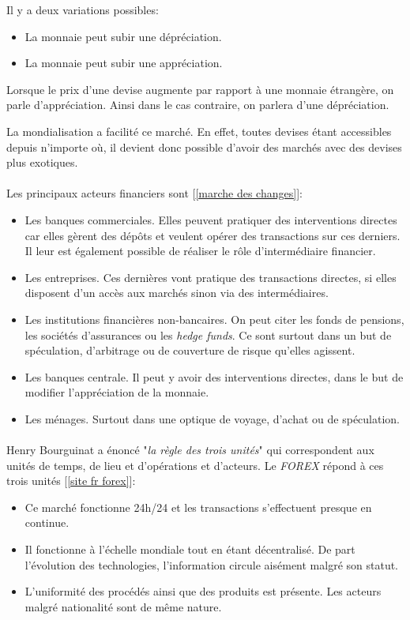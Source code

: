 \documentclass[a4paper, 11pt]{article}
\begin{document}
Il y a deux variations possibles:
\begin{itemize}
\item La monnaie peut subir une dépréciation.
\item La monnaie peut subir une appréciation.
\end{itemize}
Lorsque le prix d'une devise augmente par rapport à une monnaie étrangère, on parle d'appréciation. Ainsi dans le cas contraire, on parlera d'une dépréciation.

La mondialisation a facilité ce marché. En effet, toutes devises étant accessibles depuis n'importe où, il devient donc possible d'avoir des marchés avec des devises plus exotiques.

\paragraph{}
Les principaux acteurs financiers sont [\ref{marche des changes}]:
\begin{itemize}
\item Les banques commerciales. Elles peuvent pratiquer des interventions directes car elles gèrent des dépôts et veulent opérer des transactions sur ces derniers. Il leur est également possible de réaliser le rôle d'intermédiaire financier.
\item Les entreprises. Ces dernières vont pratique des transactions directes, si elles disposent d'un accès aux marchés sinon via des intermédiaires.
\item Les institutions financières non-bancaires. On peut citer les fonds de pensions, les sociétés d'assurances ou les \textit{hedge funds}. Ce sont surtout dans un but de spéculation, d'arbitrage ou de couverture de risque qu'elles agissent.
\item Les banques centrale. Il peut y avoir des interventions directes, dans le but de modifier l'appréciation de la monnaie.
\item Les ménages. Surtout dans une optique de voyage, d'achat ou de spéculation.
\end{itemize}

\paragraph{}
Henry Bourguinat a énoncé "\textit{la règle des trois unités}" qui correspondent aux unités de temps, de lieu et d'opérations et d'acteurs.
Le \textit{FOREX} répond à ces trois unités [\ref{site fr forex}]:
\begin{itemize}
\item Ce marché fonctionne 24h/24 et les transactions s'effectuent presque en continue.
\item Il fonctionne à l'échelle mondiale tout en étant décentralisé. De part l'évolution des technologies, l'information circule aisément malgré son statut.
\item L'uniformité des procédés ainsi que des produits est présente. Les acteurs malgré nationalité sont de même nature.
\end{itemize}
\end{document}
